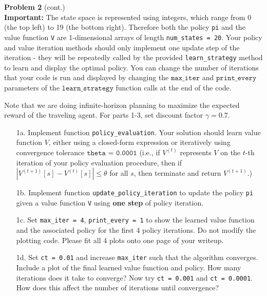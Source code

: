 \documentclass[submit]{harvardml}
\begin{document}
\begin{framed}
\textbf{Problem 2} (cont.)\\

\textbf{Important: } The state space is represented using integers, which range from 0 (the top left) to 19 (the bottom right). Therefore both the policy \texttt{pi} and the value function \texttt{V} are 1-dimensional arrays of length \texttt{num\_states = 20}. Your policy and value iteration methods should only implement one update step of the iteration - they will be repeatedly called by the provided \texttt{learn\_strategy} method to learn and display the optimal policy. You can change the number of iterations that your code is run and displayed by changing the $\texttt{max\_iter}$ and $\texttt{print\_every}$ parameters of the $\texttt{learn\_strategy}$ function calls at the end of the code.

Note that we are doing infinite-horizon planning to maximize the expected reward of the traveling agent. For parts 1-3, set discount factor $\gamma = 0.7$.

\begin{itemize}
    \item[1a.]  Implement function \texttt{policy\_evaluation}.  Your
      solution should learn value function $V$, either using a closed-form expression or iteratively using
      convergence tolerance $\texttt{theta = 0.0001}$ (i.e., if
      $V^{(t)}$ represents $V$ on the $t$-th iteration of your policy
      evaluation procedure, then if $|V^{(t + 1)}[s] - V^{(t)}[s]|
      \leq \theta$ for all $s$, then terminate and return $V^{(t + 1)}$.)

    \item[1b.] Implement function \texttt{update\_policy\_iteration} to update the policy \texttt{pi} given a value function \texttt{V} using \textbf{one step} of policy iteration.
    
    \item[1c.] Set \texttt{max\_iter = 4}, \texttt{print\_every = 1} to show the learned value function and the associated policy for the first 4 policy iterations. Do not modify the plotting code. Please fit all 4 plots onto one page of your writeup.
    
    \item [1d.] Set \texttt{ct = 0.01} and increase \texttt{max\_iter} such that the algorithm converges. Include a plot of the final learned value function and policy. How many iterations does it take to converge? Now try \texttt{ct = 0.001} and \texttt{ct = 0.0001}. How does this affect the number of iterations until convergence?
      

\end{itemize}
\end{framed}
\end{document}

